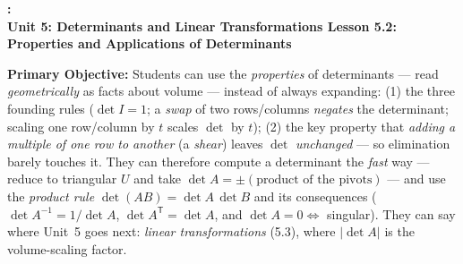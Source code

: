 \documentclass[10pt]{article}
\newcommand{\T}{\mathsf{T}}
\newcommand{\UnitNumberName}{Unit 5: Determinants and Linear Transformations \quad}
\newcommand{\LessonNumberName}{Lesson 5.2: Properties and Applications of Determinants}
\begin{document}
\begin{center}
    {\Large\bfseries \CourseName: \SchoolYear \\
    {\small\bfseries \UnitNumberName \LessonNumberName}}
\end{center}

\begin{tcolorbox}[colback=blush, colframe=burgundy, boxrule=0.9pt, arc=2mm,
    left=2mm, right=2mm, top=1.5mm, bottom=1.5mm]
    \textbf{Primary Objective:} Students can use the \emph{properties} of determinants --- read
    \emph{geometrically} as facts about volume --- instead of always expanding: (1) the three founding
    rules ($\det I=1$; a \emph{swap} of two rows/columns \emph{negates} the determinant; scaling one
    row/column by $t$ scales $\det$ by $t$); (2) the key property that \emph{adding a multiple of one
    row to another} (a \emph{shear}) leaves $\det$ \emph{unchanged} --- so elimination barely touches
    it. They can therefore compute a determinant the \emph{fast} way --- reduce to triangular $U$ and
    take $\det A=\pm(\text{product of the pivots})$ --- and use the \emph{product rule}
    $\det(AB)=\det A\,\det B$ and its consequences ($\det A^{-1}=1/\det A$, $\det A^{\T}=\det A$,
    and $\det A=0\Leftrightarrow$ singular). They can say where Unit~5 goes next: \emph{linear
    transformations} (5.3), where $|\det A|$ is the volume-scaling factor.
\end{tcolorbox}
\end{document}
